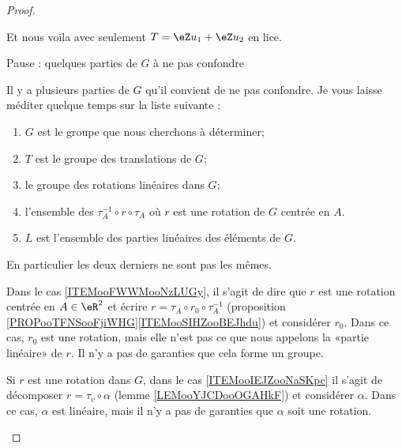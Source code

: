 \begin{proof}
\begin{subproof}
\begin{subproof}
            \end{subproof}
    \end{subproof}

    Et nous voila avec seulement \( T=\eZ u_1+\eZ u_2\) en lice.

    \begin{subproof}
        \item[Pause : quelques parties de \( G\) à ne pas confondre]

            Il y a plusieurs parties de \( G\) qu'il convient de ne pas confondre. Je vous laisse méditer quelque temps sur la liste suivante :
            \begin{enumerate}
                \item \( G\) est le groupe que nous cherchons à déterminer;
                \item \( T\) est le groupe des translations de \( G\);
                \item le groupe des rotations linéaires dans \( G\);
                \item l'ensemble des \( \tau_A^{-1}\circ r\circ\tau_A\) où \( r\) est une rotation de \( G\) centrée en \( A\).     \label{ITEMooFWWMooNzLUGy}
                \item \( L\) est l'ensemble des parties linéaires des éléments de \( G\).      \label{ITEMooIEJZooNaSKpc}
            \end{enumerate}
            En particulier les deux derniers ne sont pas les mêmes. 

            Dans le cas \ref{ITEMooFWWMooNzLUGy}, il s'agit de dire que \( r\) est une rotation centrée en \( A\in \eR^2\) et écrire \( r=\tau_A\circ r_0\circ \tau_A^{-1}\) (proposition \ref{PROPooTFNSooFjiWHG}\ref{ITEMooSIHZooBEJhdu}) et considérer \( r_0\). Dans ce cas, \( r_0\) est une rotation, mais elle n'est pas ce que nous appelons la «partie linéaire» de \( r\). Il n'y a pas de garanties que cela forme un groupe.
            
            Si \( r\) est une rotation dans \( G\), dans le cas \ref{ITEMooIEJZooNaSKpc} il s'agit de décomposer \( r=\tau_v\circ\alpha\) (lemme \ref{LEMooYJCDooOGAHkF}) et considérer \( \alpha\). Dans ce cas, \( \alpha\) est linéaire, mais il n'y a pas de garanties que \( \alpha\) soit une rotation. 
            

\end{subproof}
\end{proof}
